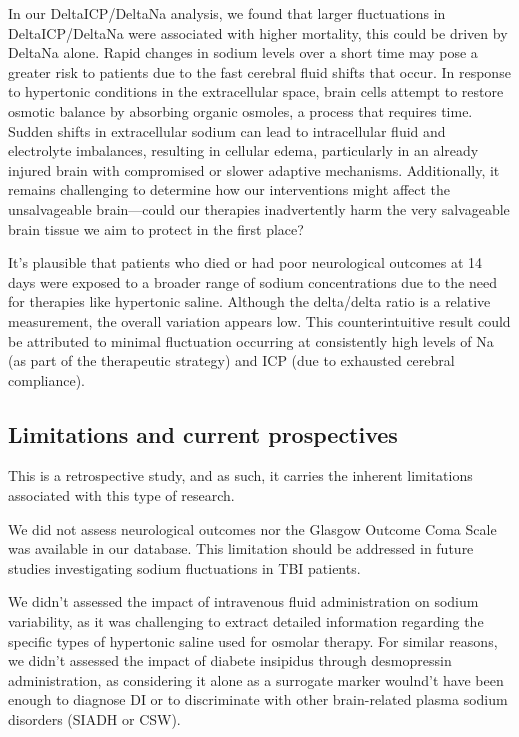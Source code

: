 In our DeltaICP/DeltaNa analysis, we found that larger fluctuations in DeltaICP/DeltaNa were associated with higher mortality, this could be driven by DeltaNa alone. Rapid changes in sodium levels over a short time may pose a greater risk to patients due to the fast cerebral fluid shifts that occur. In response to hypertonic conditions in the extracellular space, brain cells attempt to restore osmotic balance by absorbing organic osmoles, a process that requires time. Sudden shifts in extracellular sodium can lead to intracellular fluid and electrolyte imbalances, resulting in cellular edema, particularly in an already injured brain with compromised or slower adaptive mechanisms. Additionally, it remains challenging to determine how our interventions might affect the unsalvageable brain—could our therapies inadvertently harm the very salvageable brain tissue we aim to protect in the first place?

It’s plausible that patients who died or had poor neurological outcomes at 14 days were exposed to a broader range of sodium concentrations due to the need for therapies like hypertonic saline. Although the delta/delta ratio is a relative measurement, the overall variation appears low. This counterintuitive result could be attributed to minimal fluctuation occurring at consistently high levels of Na (as part of the therapeutic strategy) and ICP (due to exhausted cerebral compliance).


\subsection{Limitations and current prospectives}
This is a retrospective study, and as such, it carries the inherent limitations associated with this type of research.

We did not assess neurological outcomes nor the Glasgow Outcome Coma Scale was available in our database. This limitation should be addressed in future studies investigating sodium fluctuations in TBI patients.

We didn't assessed the impact of intravenous fluid administration on sodium variability, as it was challenging to extract detailed information regarding the specific types of hypertonic saline\cite{holdenHypertonicSalineUse2023a} used for osmolar therapy.
For similar reasons, we didn't assessed the impact of diabete insipidus through desmopressin administration, as considering it alone as a surrogate marker woulnd't have been enough to diagnose DI or to discriminate with other brain-related plasma sodium disorders (SIADH or CSW). 

